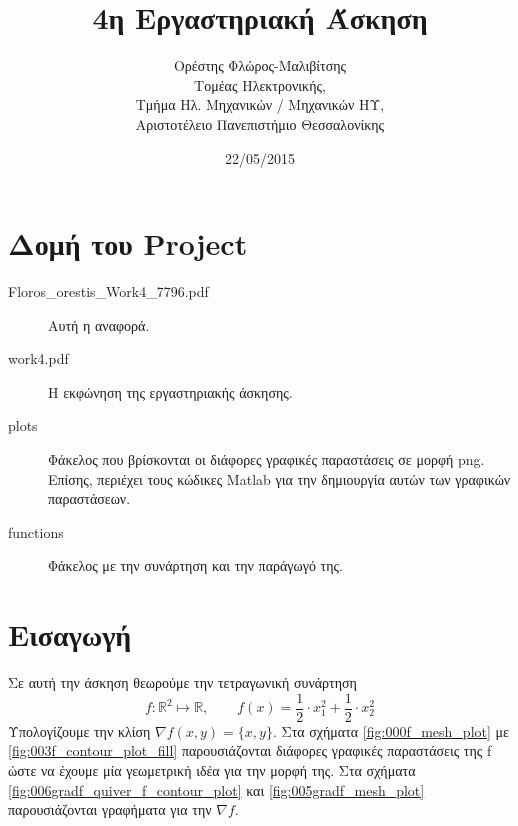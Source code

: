 \documentclass[12pt,titlepage,letterpaper,onecolumn]{report}
\title{4η Εργαστηριακή Άσκηση}
\author{Ορέστης Φλώρος-Μαλιβίτσης\\
  Τομέας Ηλεκτρονικής,\\
  Τμήμα Ηλ. Μηχανικών / Μηχανικών ΗΥ,\\
  Αριστοτέλειο Πανεπιστήμιο Θεσσαλονίκης}
\date{22/05/2015}
\begin{document}
\maketitle
\tableofcontents
\listoffigures
\newpage


\chapter*{Δομή του Project} \label{project-structure}

\begin{description}
	\item[Floros\_orestis\_Work4\_7796.pdf] Αυτή η αναφορά.
	\item[work4.pdf] Η εκφώνηση της εργαστηριακής άσκησης.
	\item[plots] Φάκελος που βρίσκονται οι διάφορες γραφικές παραστάσεις σε μορφή png. Επίσης, περιέχει τους κώδικες Matlab για την δημιουργία αυτών των γραφικών παραστάσεων.
	\item[functions] Φάκελος με την συνάρτηση και την παράγωγό της.
\end{description}

\chapter{Εισαγωγή} \label{intro}

Σε αυτή την άσκηση θεωρούμε την τετραγωνική συνάρτηση
\begin{equation*}
	f:\mathbb{R}^{2} \mapsto \mathbb{R}, \qquad f(x) = \frac{1}{2} \cdot x_1 ^ 2 + \frac{1}{2} \cdot x_2^2
\end{equation*}
Υπολογίζουμε την κλίση $\nabla f(x, y) = \{x, y\}$. \newline
Στα σχήματα \ref{fig:000f_mesh_plot} με \ref{fig:003f_contour_plot_fill} παρουσιάζονται διάφορες γραφικές παραστάσεις της f ώστε να έχουμε μία γεωμετρική ιδέα για την μορφή της. Στα σχήματα \ref{fig:006gradf_quiver_f_contour_plot} και \ref{fig:005gradf_mesh_plot} παρουσιάζονται γραφήματα για την $\nabla f$.
\end{document}
